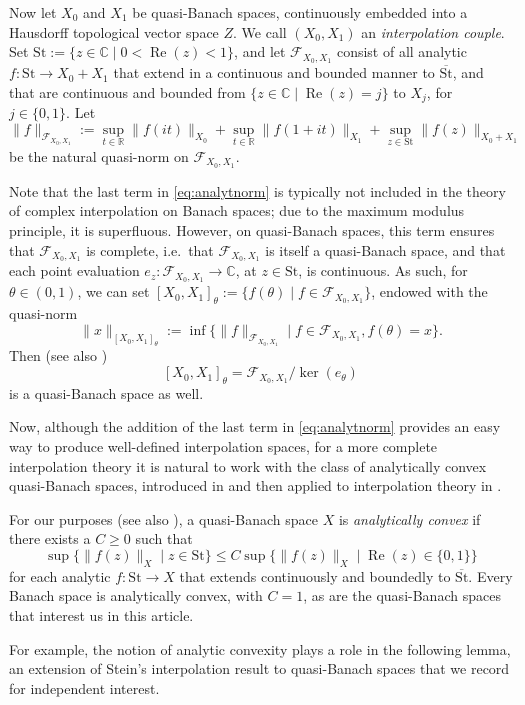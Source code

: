 \documentclass{amsart}
\newcommand {\C}{{\mathbb C}}
\newcommand {\F}{\mathcal{F}}
\newcommand {\R}{\mathbb R}
\newcommand {\St}{{\mathrm{St}}}
\DeclareMathOperator{\Real}{Re}
\theoremstyle{definition}
\numberwithin{equation}{section}
\begin{document}
Now let $X_{0}$ and $X_{1}$ be quasi-Banach spaces, continuously embedded into a Hausdorff topological vector space $Z$. We call $(X_{0},X_{1})$ an \emph{interpolation couple}. Set $\St:=\{z\in\C\mid 0<\Real(z)<1\}$, and let $\F_{X_{0},X_{1}}$ consist of all analytic $f:\St\to X_{0}+X_{1}$ that extend in a continuous and bounded manner to $\overline{\St}$, and that are continuous and bounded from $\{z\in \C\mid \Real(z)=j\}$ to $X_{j}$, for $j\in\{0,1\}$. Let
\begin{equation}\label{eq:analytnorm}
\|f\|_{\F_{X_{0},X_{1}}}:=\sup_{t\in\R}\|f(it)\|_{X_{0}}+\sup_{t\in\R}\|f(1+it)\|_{X_{1}}+\sup_{z\in\St}\|f(z)\|_{X_{0}+X_{1}}
\end{equation}
be the natural quasi-norm on $\F_{X_{0},X_{1}}$. 

Note that the last term in \eqref{eq:analytnorm} is typically not included in the theory of complex interpolation on Banach spaces; due to the maximum modulus principle, it is superfluous. However, on quasi-Banach spaces, this term ensures that $\F_{X_{0},X_{1}}$ is complete, i.e.~that $\F_{X_{0},X_{1}}$ is itself a quasi-Banach space, and that each point evaluation $e_{z}:\F_{X_{0},X_{1}}\to\C$, at $z\in\St$, is continuous. As such, for $\theta\in(0,1)$, we can set $[X_{0},X_{1}]_{\theta}:=\{f(\theta)\mid f\in \F_{X_{0},X_{1}}\}$, endowed with the quasi-norm
\[
\|x\|_{[X_{0},X_{1}]_{\theta}}:=\inf\{\|f\|_{\F_{X_{0},X_{1}}}\mid f\in \F_{X_{0},X_{1}},f(\theta)=x\}.
\]
Then (see also \cite[Lemma 2.1]{Kalton-Mitrea98})
\[
[X_{0},X_{1}]_{\theta}=\F_{X_{0},X_{1}}/\ker(e_{\theta})
\]
is a quasi-Banach space as well.

Now, although the addition of the last term in \eqref{eq:analytnorm} provides an easy way to produce well-defined interpolation spaces, for a more complete interpolation theory it is natural to work with the class of analytically convex quasi-Banach spaces, introduced in \cite{Kalton86b} and then applied to interpolation theory in \cite{Kalton-Mitrea98}.

For our purposes (see also \cite[Theorem 7.4]{KaMaMi07}), a quasi-Banach space $X$ is \emph{analytically convex} if there exists a $C\geq0$ such that 
\[
\sup\{\|f(z)\|_{X} \mid  z\in\St\}\leq C\sup\{\|f(z)\|_{X}\mid  \Real(z)\in \{0, 1\}\}
\]
for each analytic $f:\St\to X$ that extends continuously and boundedly to $\overline{\St}$. Every Banach space is analytically convex, with $C=1$, as are the quasi-Banach spaces that interest us in this article. 

For example, the notion of analytic convexity plays a role in the following lemma, an extension of Stein's interpolation result to quasi-Banach spaces that we record for independent interest.
\end{document}
